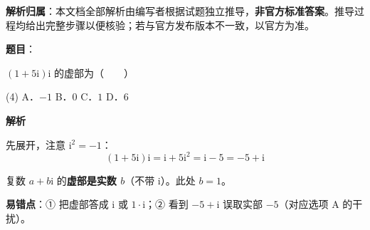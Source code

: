 

\begin{gknotice}
\textbf{解析归属}：本文档全部解析由编写者根据试题独立推导，\textbf{非官方标准答案}。推导过程均给出完整步骤以便核验；若与官方发布版本不一致，以官方为准。
\end{gknotice}

\par\medskip


\begin{answer}

\textbf{题目}：

$(1+5\mathrm{i})\mathrm{i}$ 的虚部为\mbox{（　　）}

\begin{gkopts}(4)
\task A．$-1$
\task B．$0$
\task C．$1$
\task D．$6$
\end{gkopts}

\textbf{解析}

先展开，注意 $\mathrm{i}^2=-1$：
\nopagebreak[4]
\[(1+5\mathrm{i})\mathrm{i}=\mathrm{i}+5\mathrm{i}^2=\mathrm{i}-5=-5+\mathrm{i}\]

复数 $a+b\mathrm{i}$ 的\textbf{虚部是实数 $b$}（不带 $\mathrm{i}$）。此处 $b=1$。

\begin{gktip}
\textbf{易错点}：① 把虚部答成 $\mathrm{i}$ 或 $1\cdot\mathrm{i}$；② 看到 $-5+\mathrm{i}$ 误取实部 $-5$（对应选项 A 的干扰）。
\end{gktip}


\par\medskip

\end{answer}
